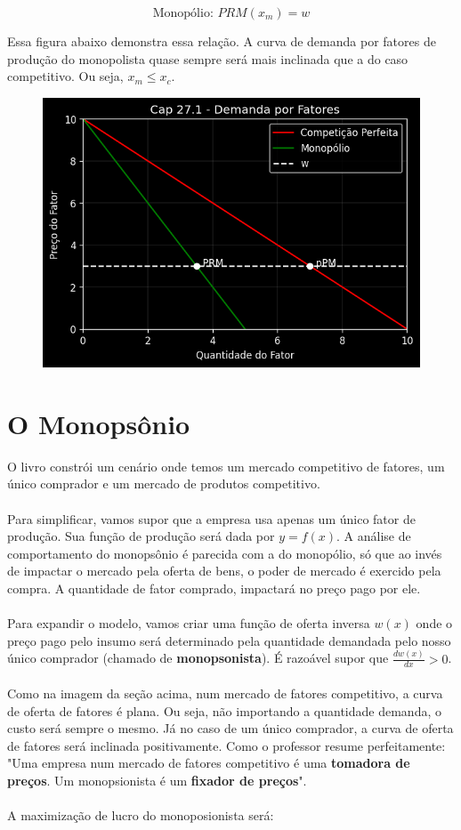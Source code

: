 \documentclass[a4paper,11pt,oneside]{book}
\theoremstyle{definition}
\theoremstyle{break}
\begin{document}
$$ \textrm{Monopólio: } PRM(x_m) = w $$

Essa figura abaixo demonstra essa relação. A curva de demanda por fatores de produção do monopolista quase sempre será mais inclinada que a do caso competitivo. Ou seja, $x_m \leq x_c$.

\begin{figure}[H]
\centering
\includegraphics[scale=0.75]{cap27_1-demanda_fatores.png}
\end{figure}

\section{O Monopsônio}

O livro constrói um cenário onde temos um mercado competitivo de fatores, um único comprador e um mercado de produtos competitivo.
\\~\\
Para simplificar, vamos supor que a empresa usa apenas um único fator de produção. Sua função de produção será dada por $y = f(x)$.  A análise de comportamento do monopsônio é parecida com a do monopólio, só que ao invés de impactar o mercado pela oferta de bens, o poder de mercado é exercido pela compra. A quantidade de fator comprado, impactará no preço pago por ele.
\\~\\
Para expandir o modelo, vamos criar uma função de oferta inversa $w(x)$ onde o preço pago pelo insumo será determinado pela quantidade demandada pelo nosso único comprador (chamado de \textbf{monopsonista}). É razoável supor que $\frac{d w(x)}{d x} > 0$.
\\~\\
Como na imagem da seção acima, num mercado de fatores competitivo, a curva de oferta de fatores é plana. Ou seja, não importando a quantidade demanda, o custo será sempre o mesmo. Já no caso de um único comprador, a curva de oferta de fatores será inclinada positivamente. Como o professor resume perfeitamente: "Uma empresa num mercado de fatores competitivo é uma \textbf{tomadora de preços}. Um monopsionista é um \textbf{fixador de preços}".
\\~\\
A maximização de lucro do monoposionista será:
\end{document}
